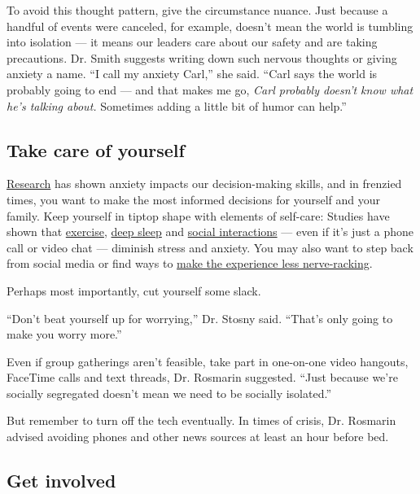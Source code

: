 To avoid this thought pattern, give the circumstance nuance. Just
because a handful of events were canceled, for example, doesn't mean the
world is tumbling into isolation --- it means our leaders care about our
safety and are taking precautions. Dr. Smith suggests writing down such
nervous thoughts or giving anxiety a name. ``I call my anxiety Carl,''
she said. ``Carl says the world is probably going to end --- and that
makes me go, \emph{Carl probably doesn't know what he's talking about.}
Sometimes adding a little bit of humor can help.''

\hypertarget{take-care-of-yourself}{%
\subsection{Take care of yourself}\label{take-care-of-yourself}}

\href{https://www.jneurosci.org/content/36/11/3322.abstract}{Research}
has shown anxiety impacts our decision-making skills, and in frenzied
times, you want to make the most informed decisions for yourself and
your family. Keep yourself in tiptop shape with elements of self-care:
Studies have shown that
\href{https://www.health.harvard.edu/blog/can-exercise-help-treat-anxiety-2019102418096}{exercise},
\href{https://www.sciencedaily.com/releases/2019/11/191104124140.htm}{deep
sleep} and
\href{https://www.nytimes3xbfgragh.onion/2017/06/12/well/live/having-friends-is-good-for-you.html}{social
interactions} --- even if it's just a phone call or video chat ---
diminish stress and anxiety. You may also want to step back from social
media or find ways to
\href{https://www.nytimes3xbfgragh.onion/2020/01/15/smarter-living/how-to-fix-social-facebook-instagram-twitter.html}{make
the experience less nerve-racking}.

Perhaps most importantly, cut yourself some slack.

``Don't beat yourself up for worrying,'' Dr. Stosny said. ``That's only
going to make you worry more.''

Even if group gatherings aren't feasible, take part in one-on-one video
hangouts, FaceTime calls and text threads, Dr. Rosmarin suggested.
``Just because we're socially segregated doesn't mean we need to be
socially isolated.''

But remember to turn off the tech eventually. In times of crisis, Dr.
Rosmarin advised avoiding phones and other news sources at least an hour
before bed.

\hypertarget{get-involved}{%
\subsection{Get involved}\label{get-involved}}

